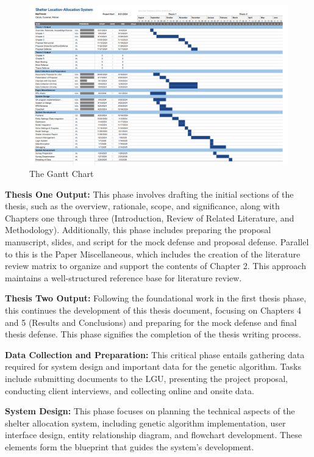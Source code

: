 	\begin{figure}[h!]
		\caption{The Gantt Chart}
		\centering
		\includegraphics[width=\textwidth]{Gantt}
	\end{figure}
	
	\textbf{Thesis One Output:} This phase involves drafting the initial sections of the thesis, such as the overview, rationale, scope, and significance, along with Chapters one through three (Introduction, Review of Related Literature, and Methodology). Additionally, this phase includes preparing the proposal manuscript, slides, and script for the mock defense and proposal defense. Parallel to this is the Paper Miscellaneous, which includes the creation of the literature review matrix to organize and support the contents of Chapter 2. This approach maintains a well-structured reference base for literature review.
	
	\textbf{Thesis Two Output:} Following the foundational work in the first thesis phase, this continues the development of this thesis document, focusing on Chapters 4 and 5 (Results and Conclusions) and preparing for the mock defense and final thesis defense. This phase signifies the completion of the thesis writing process.
	
	\textbf{Data Collection and Preparation:} This critical phase entails gathering data required for system design and important data for the genetic algorithm. Tasks include submitting documents to the LGU, presenting the project proposal, conducting client interviews, and collecting online and onsite data.
	
	\textbf{System Design:} This phase focuses on planning the technical aspects of the shelter allocation system, including genetic algorithm implementation, user interface design, entity relationship diagram, and flowchart development. These elements form the blueprint that guides the system's development.
	
